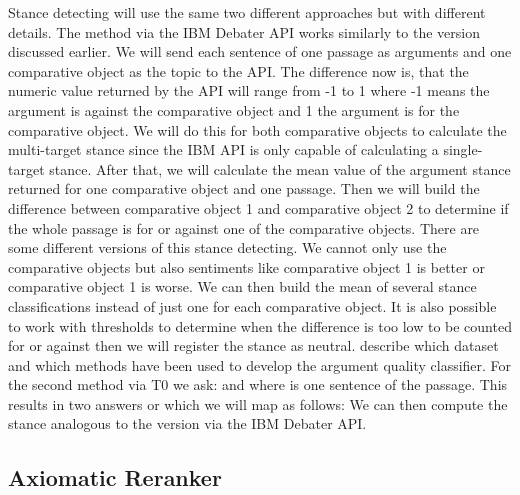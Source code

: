 Stance detecting will use the same two different approaches but with different details.
The method via the IBM Debater API works similarly to the version discussed earlier.
We will send each sentence of one passage as arguments and one comparative object as the topic to the API.
The difference now is, that the numeric value returned by the API will range from -1 to 1 where -1 means the argument is against the comparative object and 1 the argument is for the comparative object.
We will do this for both comparative objects to calculate the multi-target stance since the IBM API is only capable of calculating a single-target stance.
After that, we will calculate the mean value of the argument stance returned for one comparative object and one passage.
Then we will build the difference between comparative object 1 and comparative object 2 to determine if the whole passage is for or against one of the comparative objects.
There are some different versions of this stance detecting.
We cannot only use the comparative objects but also sentiments like comparative object 1 is better or comparative object 1 is worse.
We can then build the mean of several stance classifications instead of just one for each comparative object.
It is also possible to work with thresholds to determine when the difference is too low to be counted for or against then we will register the stance as neutral.
\citet{BarHaimBDSS2017} describe which dataset and which methods have been used to develop the argument quality classifier.
For the second method via T0 we ask:  and  where  is one sentence of the passage.
This results in two answers  or  which we will map as follows: 
We can then compute the stance analogous to the version via the IBM Debater API.

\subsection{Axiomatic Reranker}



